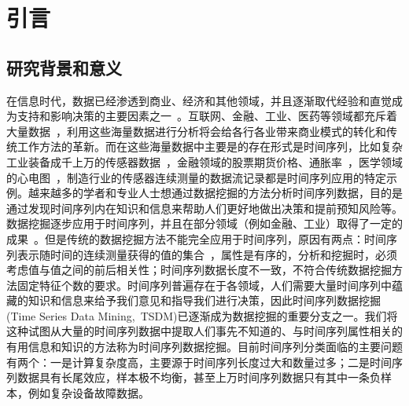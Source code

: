 \chapter{引言}
\label{cha:intro}

\section{研究背景和意义}

在信息时代，数据已经渗透到商业、经济和其他领域，并且逐渐取代经验和直觉成为支持和影响决策的主要因素之一~\cite{anandarajan2012business}。互联网、金融、工业、医药等领域都充斥着大量数据~\cite{zhang2016unsupervised}，利用这些海量数据进行分析将会给各行各业带来商业模式的转化和传统工作方法的革新。而在这些海量数据中主要是的存在形式是时间序列，比如复杂工业装备成千上万的传感器数据~\cite{sprint2017analyzing}，金融领域的股票期货价格、通胀率~\cite{chakraborti2007financial}，医学领域的心电图~\cite{cammarota2010time}，制造行业的传感器连续测量的数据流记录都是时间序列应用的特定示例。越来越多的学者和专业人士想通过数据挖掘的方法分析时间序列数据，目的是通过发现时间序列内在知识和信息来帮助人们更好地做出决策和提前预知风险等。数据挖掘逐步应用于时间序列，并且在部分领域（例如金融、工业）取得了一定的成果~\cite{rangaswamy2013time}。但是传统的数据挖掘方法不能完全应用于时间序列，原因有两点：时间序列表示随时间的连续测量获得的值的集合~\cite{esling2012time}，属性是有序的，分析和挖掘时，必须考虑值与值之间的前后相关性；时间序列数据长度不一致，不符合传统数据挖掘方法固定特征个数的要求。时间序列普遍存在于各领域，人们需要大量时间序列中蕴藏的知识和信息来给予我们意见和指导我们进行决策，因此时间序列数据挖掘(Time Series Data Mining,~TSDM)已逐渐成为数据挖掘的重要分支之一。我们将这种试图从大量的时间序列数据中提取人们事先不知道的、与时间序列属性相关的有用信息和知识的方法称为时间序列数据挖掘。目前时间序列分类面临的主要问题有两个：一是计算复杂度高，主要源于时间序列长度过大和数量过多；二是时间序列数据具有长尾效应，样本极不均衡，甚至上万时间序列数据只有其中一条负样本，例如复杂设备故障数据。

